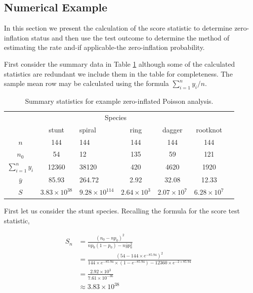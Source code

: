 \documentclass{article}
\begin{document}
\subsection{Numerical Example} 

In this section we present the calculation of the score statistic to determine zero-inflation status and then use the test outcome to determine the method of estimating the rate and-if applicable-the zero-inflation probability. 

First consider the summary data in Table \ref{tab:table_zip_data} although some of the calculated statistics are redundant we include them in the table for completeness. The sample mean row may be calculated using the formula $\sum_{i=1}^ny_i/n$. 

\begin{table}

\begin{center}
\begin{tabular}{c | c l c  c  c  c  }
\hline
\multicolumn{6}{c}{Species} \\
\cline{1-6}
& stunt & spiral & ring  & dagger & rootknot \\
\hline
$n$& 144 &144  &144 &144 &144  \\
$n_0$ &54  & 12 &135 &59 & 121 \\
$\sum_{i=1}^ny_i$ &12360 & 38120 & 420&4620 &1920 \\
$\bar{y}$ &85.93 &264.72  &2.92 & 32.08& 12.33 \\
$S$ &$3.83\times10^{38}$ &$9.28\times10^{114}$ & $2.64\times10^3$ &$2.07\times10^7$ &$6.28\times10^7$  \\
\hline
\end{tabular}
\end{center}
\caption{Summary statistics for example zero-inflated Poisson analysis. }
 \label{tab:table_zip_data}
\end{table}

First let us consider the stunt species. Recalling the formula for the score test statistic,

\begin{eqnarray}
S_n &= \frac{(n_0 - np_0)^2}{np_0(1-p_0) - n\bar{y}p_0^2}\\
&= \frac{(54 - 144\times e^{-85.94})^2 }{144\times e^{-85.94}\times (1-e^{-85.94}) - 12360\times e^{-2\times85.94} }\\
&= \frac{2.92\times10^{3}}{7.61\times10^{-36}}\\
&\approx3.83\times10^{38}
\end{eqnarray}
\end{document}
